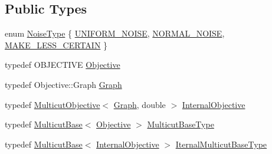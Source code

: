 \subsection*{Public Types}
\begin{DoxyCompactItemize}
\item 
enum \hyperlink{classnifty_1_1graph_1_1optimization_1_1multicut_1_1PerturbAndMap_a88d773cee3d185e28aecdc2c2707b744}{Noise\+Type} \{ \hyperlink{classnifty_1_1graph_1_1optimization_1_1multicut_1_1PerturbAndMap_a88d773cee3d185e28aecdc2c2707b744a181e4a0a98b06f50587b3cf7f1b28c59}{U\+N\+I\+F\+O\+R\+M\+\_\+\+N\+O\+I\+S\+E}, 
\hyperlink{classnifty_1_1graph_1_1optimization_1_1multicut_1_1PerturbAndMap_a88d773cee3d185e28aecdc2c2707b744aacbcee87d9d0ebaac36ca287c948ddc9}{N\+O\+R\+M\+A\+L\+\_\+\+N\+O\+I\+S\+E}, 
\hyperlink{classnifty_1_1graph_1_1optimization_1_1multicut_1_1PerturbAndMap_a88d773cee3d185e28aecdc2c2707b744a2cb2a7701e9f7486014039cb6a907218}{M\+A\+K\+E\+\_\+\+L\+E\+S\+S\+\_\+\+C\+E\+R\+T\+A\+I\+N}
 \}
\item 
typedef O\+B\+J\+E\+C\+T\+I\+V\+E \hyperlink{classnifty_1_1graph_1_1optimization_1_1multicut_1_1PerturbAndMap_a2048cdfa7924f3638cbf678021514bdd}{Objective}
\item 
typedef Objective\+::\+Graph \hyperlink{classnifty_1_1graph_1_1optimization_1_1multicut_1_1PerturbAndMap_a97e092acc69aeaa88390baf080709c1e}{Graph}
\item 
typedef \hyperlink{classnifty_1_1graph_1_1optimization_1_1multicut_1_1MulticutObjective}{Multicut\+Objective}$<$ \hyperlink{classnifty_1_1graph_1_1optimization_1_1multicut_1_1PerturbAndMap_a97e092acc69aeaa88390baf080709c1e}{Graph}, double $>$ \hyperlink{classnifty_1_1graph_1_1optimization_1_1multicut_1_1PerturbAndMap_a132b5f0c3378a51f721ee841c7f1d369}{Internal\+Objective}
\item 
typedef \hyperlink{classnifty_1_1graph_1_1optimization_1_1multicut_1_1MulticutBase}{Multicut\+Base}$<$ \hyperlink{classnifty_1_1graph_1_1optimization_1_1multicut_1_1PerturbAndMap_a2048cdfa7924f3638cbf678021514bdd}{Objective} $>$ \hyperlink{classnifty_1_1graph_1_1optimization_1_1multicut_1_1PerturbAndMap_a46831cc073623314c4d077f4e51bbeb5}{Multicut\+Base\+Type}
\item 
typedef \hyperlink{classnifty_1_1graph_1_1optimization_1_1multicut_1_1MulticutBase}{Multicut\+Base}$<$ \hyperlink{classnifty_1_1graph_1_1optimization_1_1multicut_1_1PerturbAndMap_a132b5f0c3378a51f721ee841c7f1d369}{Internal\+Objective} $>$ \hyperlink{classnifty_1_1graph_1_1optimization_1_1multicut_1_1PerturbAndMap_a7fc461eff81908dda41de81d703bc895}{Iternal\+Multicut\+Base\+Type}

\end{DoxyCompactItemize}
